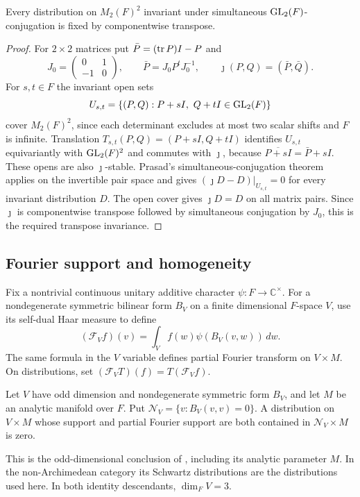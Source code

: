 \begin{lemma}
\label{m1:lem:matrix-pair-transpose}
Every distribution on $M_2(F)^2$ invariant under simultaneous
$\operatorname{GL}_2(F)$-conjugation is fixed by componentwise transpose.
\end{lemma}
\begin{proof}
For $2\times2$ matrices put
$\bar P=(\operatorname{tr} P)I-P$ and
\[
 J_0=\begin{pmatrix}0&1\\-1&0\end{pmatrix},\qquad
 \bar P=J_0P^tJ_0^{-1},\qquad
 \jmath(P,Q)=(\bar P,\bar Q).
\]
For $s,t\in F$ the invariant open sets
\begin{equation}\label{m1:eq:scalar-translation-cover}
 U_{s,t}=\{(P,Q):P+sI,\ Q+tI\in\operatorname{GL}_2(F)\}
\end{equation}
cover $M_2(F)^2$, since each determinant excludes at most two scalar
shifts and $F$ is infinite. Translation
$T_{s,t}(P,Q)=(P+sI,Q+tI)$ identifies $U_{s,t}$ equivariantly with
$\operatorname{GL}_2(F)^2$ and commutes with $\jmath$, because
$\overline{P+sI}=\bar P+sI$. These opens are also $\jmath$-stable.
Prasad's simultaneous-conjugation theorem
\cite[Proposition~4.5]{Prasad90} applies on the invertible pair space and
gives $(\jmath D-D)|_{U_{s,t}}=0$ for every invariant distribution $D$.
The open cover gives $\jmath D=D$ on all matrix pairs. Since $\jmath$
is componentwise transpose followed by simultaneous conjugation by
$J_0$, this is the required transpose invariance.
\end{proof}

\subsection{Fourier support and homogeneity}
Fix a nontrivial continuous unitary additive character $\psi:F\to\mathbb C^\times$.
For a nondegenerate symmetric bilinear form $B_V$ on a finite
dimensional $F$-space $V$, use its self-dual Haar measure to define
\[
 (\mathcal F_V f)(v)=\int_V f(w)\psi(B_V(v,w))\,dw.
\]
The same formula in the $V$ variable defines partial Fourier
transform on $V\times M$. On distributions, set
$(\mathcal F_VT)(f)=T(\mathcal F_Vf)$.

\begin{theorem}\label{m2:tools:homogeneity}
Let $V$ have odd dimension and nondegenerate symmetric form $B_V$,
and let $M$ be an analytic manifold over $F$. Put
$\mathcal N_V=\{v:B_V(v,v)=0\}$. A distribution on $V\times M$
whose support and partial Fourier support are both contained in
$\mathcal N_V\times M$ is zero.
\end{theorem}

This is the odd-dimensional conclusion of
\cite[Theorem~5.1.5]{AGDescent}, including its analytic parameter $M$.
In the non-Archimedean category its Schwartz distributions are the
distributions used here. In both identity descendants, $\dim_FV=3$.
